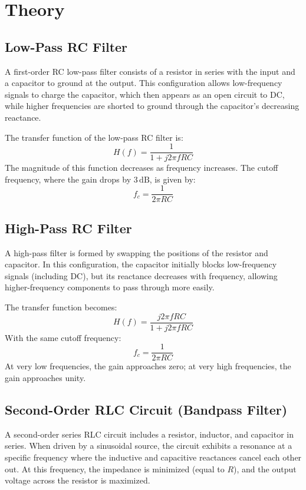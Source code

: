 \documentclass[12pt]{article}
\begin{document}
\section{Theory}

\subsection{Low-Pass RC Filter}

A first-order RC low-pass filter consists of a resistor in series with the input and a capacitor to ground at the output. This configuration allows low-frequency signals to charge the capacitor, which then appears as an open circuit to DC, while higher frequencies are shorted to ground through the capacitor’s decreasing reactance.

The transfer function of the low-pass RC filter is:
\[
	H(f) = \frac{1}{1 + j2\pi fRC}
\]
The magnitude of this function decreases as frequency increases. The cutoff frequency, where the gain drops by $3\,\mathrm{dB}$, is given by:
\[
	f_c = \frac{1}{2\pi RC}
\]

\subsection{High-Pass RC Filter}

A high-pass filter is formed by swapping the positions of the resistor and capacitor. In this configuration, the capacitor initially blocks low-frequency signals (including DC), but its reactance decreases with frequency, allowing higher-frequency components to pass through more easily.

The transfer function becomes:
\[
	H(f) = \frac{j2\pi fRC}{1 + j2\pi fRC}
\]
With the same cutoff frequency:
\[
	f_c = \frac{1}{2\pi RC}
\]
At very low frequencies, the gain approaches zero; at very high frequencies, the gain approaches unity.

\subsection{Second-Order RLC Circuit (Bandpass Filter)}

A second-order series RLC circuit includes a resistor, inductor, and capacitor in series. When driven by a sinusoidal source, the circuit exhibits a resonance at a specific frequency where the inductive and capacitive reactances cancel each other out. At this frequency, the impedance is minimized (equal to $R$), and the output voltage across the resistor is maximized.
\end{document}
